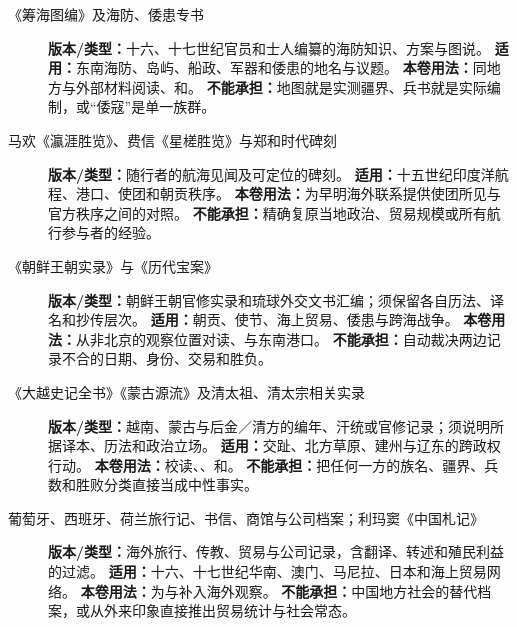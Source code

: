 \begin{description}
  \item[《筹海图编》及海防、倭患专书] \textbf{版本/类型：}十六、十七世纪官员和士人编纂的海防知识、方案与图说。 \textbf{适用：}东南海防、岛屿、船政、军器和倭患的地名与议题。 \textbf{本卷用法：}同地方与外部材料阅读、和。 \textbf{不能承担：}地图就是实测疆界、兵书就是实际编制，或“倭寇”是单一族群。
  \item[马欢《瀛涯胜览》、费信《星槎胜览》与郑和时代碑刻] \textbf{版本/类型：}随行者的航海见闻及可定位的碑刻。 \textbf{适用：}十五世纪印度洋航程、港口、使团和朝贡秩序。 \textbf{本卷用法：}为早明海外联系提供使团所见与官方秩序之间的对照。 \textbf{不能承担：}精确复原当地政治、贸易规模或所有航行参与者的经验。
  \item[《朝鲜王朝实录》与《历代宝案》] \textbf{版本/类型：}朝鲜王朝官修实录和琉球外交文书汇编；须保留各自历法、译名和抄传层次。 \textbf{适用：}朝贡、使节、海上贸易、倭患与跨海战争。 \textbf{本卷用法：}从非北京的观察位置对读、与东南港口。 \textbf{不能承担：}自动裁决两边记录不合的日期、身份、交易和胜负。
  \item[《大越史记全书》《蒙古源流》及清太祖、清太宗相关实录] \textbf{版本/类型：}越南、蒙古与后金／清方的编年、汗统或官修记录；须说明所据译本、历法和政治立场。 \textbf{适用：}交趾、北方草原、建州与辽东的跨政权行动。 \textbf{本卷用法：}校读、、和。 \textbf{不能承担：}把任何一方的族名、疆界、兵数和胜败分类直接当成中性事实。
  \item[葡萄牙、西班牙、荷兰旅行记、书信、商馆与公司档案；利玛窦《中国札记》] \textbf{版本/类型：}海外旅行、传教、贸易与公司记录，含翻译、转述和殖民利益的过滤。 \textbf{适用：}十六、十七世纪华南、澳门、马尼拉、日本和海上贸易网络。 \textbf{本卷用法：}为与补入海外观察。 \textbf{不能承担：}中国地方社会的替代档案，或从外来印象直接推出贸易统计与社会常态。
\end{description}
